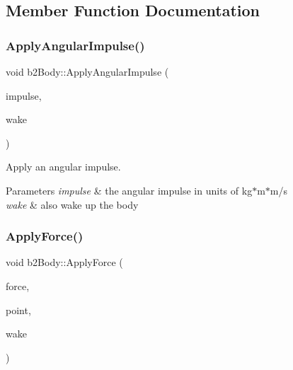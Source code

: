 \subsection{Member Function Documentation}
\mbox{\label{classb2_body_a65384cfad8db2376cdf3fab38cac06e5}} 
\subsubsection{\texorpdfstring{ApplyAngularImpulse()}{ApplyAngularImpulse()}}
{\footnotesize\ttfamily void b2\+Body\+::\+Apply\+Angular\+Impulse (\begin{DoxyParamCaption}\item[{\mbox{\hyperlink{b2_settings_8h_aacdc525d6f7bddb3ae95d5c311bd06a1}{float32}}}]{impulse,  }\item[{bool}]{wake }\end{DoxyParamCaption})\hspace{0.3cm}{\ttfamily [inline]}}

Apply an angular impulse. 
\begin{DoxyParams}{Parameters}
{\em impulse} & the angular impulse in units of kg$\ast$m$\ast$m/s \\
\hline
{\em wake} & also wake up the body \\
\hline
\end{DoxyParams}
\mbox{\label{classb2_body_a942be8e1cd2bcd06f53c4638c45a9525}} 
\subsubsection{\texorpdfstring{ApplyForce()}{ApplyForce()}}
{\footnotesize\ttfamily void b2\+Body\+::\+Apply\+Force (\begin{DoxyParamCaption}\item[{const \mbox{\hyperlink{structb2_vec2}{b2\+Vec2}} \&}]{force,  }\item[{const \mbox{\hyperlink{structb2_vec2}{b2\+Vec2}} \&}]{point,  }\item[{bool}]{wake }\end{DoxyParamCaption})\hspace{0.3cm}{\ttfamily [inline]}}

